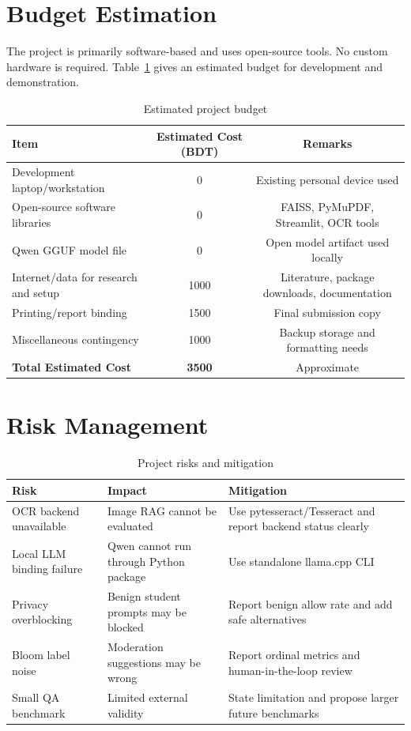 \section{Budget Estimation}

The project is primarily software-based and uses open-source tools. No custom hardware is required. Table~\ref{tab:budget_report} gives an estimated budget for development and demonstration.

\begin{table}[H]
\centering
\caption{Estimated project budget}
\label{tab:budget_report}
\begin{tabular}{p{}cc}
\toprule
\textbf{Item} & \textbf{Estimated Cost (BDT)} & \textbf{Remarks}\\
\midrule
Development laptop/workstation & 0 & Existing personal device used\\
Open-source software libraries & 0 & FAISS, PyMuPDF, Streamlit, OCR tools\\
Qwen GGUF model file & 0 & Open model artifact used locally\\
Internet/data for research and setup & 1000 & Literature, package downloads, documentation\\
Printing/report binding & 1500 & Final submission copy\\
Miscellaneous contingency & 1000 & Backup storage and formatting needs\\
\midrule
\textbf{Total Estimated Cost} & \textbf{3500} & Approximate\\
\bottomrule
\end{tabular}
\end{table}

\section{Risk Management}

\begin{table}[H]
\centering
\caption{Project risks and mitigation}
\label{tab:risks_report}
\begin{tabular}{p{}p{}p{}}
\toprule
\textbf{Risk} & \textbf{Impact} & \textbf{Mitigation}\\
\midrule
OCR backend unavailable & Image RAG cannot be evaluated & Use pytesseract/Tesseract and report backend status clearly\\
Local LLM binding failure & Qwen cannot run through Python package & Use standalone llama.cpp CLI\\
Privacy overblocking & Benign student prompts may be blocked & Report benign allow rate and add safe alternatives\\
Bloom label noise & Moderation suggestions may be wrong & Report ordinal metrics and human-in-the-loop review\\
Small QA benchmark & Limited external validity & State limitation and propose larger future benchmarks\\
\bottomrule
\end{tabular}
\end{table}

